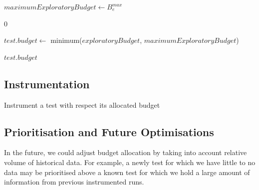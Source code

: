 {\begin{algorithm}[h]
\begin{algorithmic}[1]
	\EndFunction
	\Statex

	\Statex


	\State $maximumExploratoryBudget \gets B_{e}^{max}$

		\Return $0$
	\EndIf

	\State $test.budget \gets$ minimum($exploratoryBudget$,
	$maximumExploratoryBudget$)

	\State \Return $test.budget$

	\EndFunction
\end{algorithmic}

\end{algorithm}


\subsection{Instrumentation}


\begin{algorithm}[H]
\caption{Instrument a test with respect its allocated budget}
\label{alg:instrument}

\begin{algorithmic}
			\Else
			\EndIf
		\EndFor
	\EndWhile
\end{algorithmic}

\end{algorithm}


\subsection{Prioritisation and Future Optimisations}

In the future, we could adjust \flaky budget allocation by taking into account
relative volume of historical data. For example, a newly \flaky test for which
we have little to no data may be prioritised above a known \flaky test for which
we hold a large amount of information from previous instrumented runs.

}
